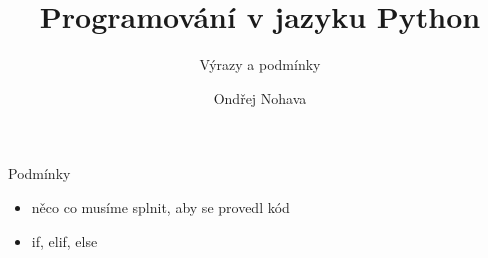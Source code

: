 \documentclass{beamer}
\title{Programování v jazyku Python}
\subtitle{Výrazy a podmínky}
\author{Ondřej Nohava}
\institute[DDMJH]{Dům dětí a mládeže Jindřichův Hradec}
\date{}
\begin{document}
\begin{frame}
\titlepage
\end{frame}

\begin{frame}[t]{Podmínky}

\begin{itemize}

	\item něco co musíme splnit, aby se provedl kód
	
	
	\item if, elif, else

\end{itemize}

\end{frame}
\end{document}
